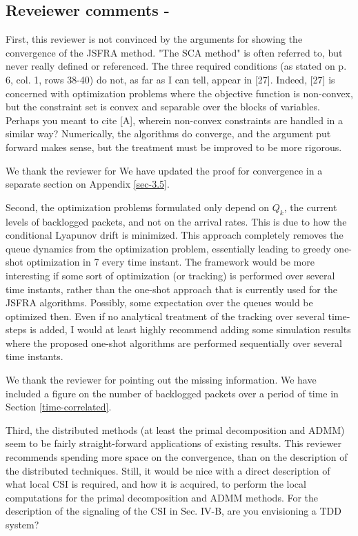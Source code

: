 \subsection*{Reveiewer comments - }

 First, this reviewer is not convinced by the arguments for showing the convergence of the JSFRA method. "The SCA method" is often referred to, but never really defined or referenced. The three required conditions (as stated on p. 6, col. 1, rows 38-40) do not, as far as I can tell, appear in [27]. Indeed, [27] is concerned with optimization problems where the objective function is non-convex, but the constraint set is convex and separable over the blocks of variables. Perhaps you meant to cite [A], wherein non-convex constraints are handled in a similar way? Numerically, the algorithms do converge, and the argument put forward makes sense, but the treatment must be improved to be more rigorous.

\resp We thank the reviewer for We have updated the proof for convergence in a separate section on Appendix \ref{sec-3.5}.

 Second, the optimization problems formulated only depend on $Q_k$, the current levels of backlogged packets, and not on the arrival rates. This is due to how the conditional Lyapunov drift is minimized. This approach completely removes the queue dynamics from the optimization problem, essentially leading to greedy one-shot optimization in 7
every time instant. The framework would be more interesting if some sort of optimization (or tracking) is performed over several time instants, rather than the one-shot approach that is currently used for the JSFRA algorithms. Possibly, some expectation over the queues would be optimized then. Even if no analytical treatment of the tracking over several time-steps is added, I would at least highly recommend adding some simulation results where the proposed one-shot algorithms are performed sequentially over several time instants.

\resp We thank the reviewer for pointing out the missing information. We have included a figure on the number of backlogged packets over a period of time in Section \ref{time-correlated}. 

 Third, the distributed methods (at least the primal decomposition and ADMM) seem to be fairly straight-forward applications of existing results. This reviewer recommends spending more space on the convergence, than on the description of the distributed techniques. Still, it would be nice with a direct description of what local CSI is required, and how it is acquired, to perform the local computations for the primal decomposition and ADMM methods. For the description of the signaling of the CSI in Sec. IV-B, are you envisioning a TDD system?

